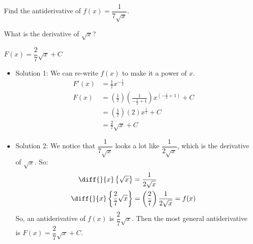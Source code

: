 \begin{question}
Find the  antiderivative of
$f(x)=\dfrac{1}{7\sqrt{x}}$.
\end{question}
\begin{hint}
What is the derivative of $\sqrt{x}$?
\end{hint}
\begin{answer}
$F(x)=\dfrac{2}{7}\sqrt{x}+C$
\end{answer}
\begin{solution}
\begin{itemize}
\item Solution 1:
We can re-write $f(x)$ to make it a power of $x$.
\begin{align*}
F'(x)&=\frac{1}{7}x^{-\tfrac{1}{2}}\\
F(x)&=\left(\frac{1}{7}\right)\left(\frac{1}{-\frac{1}{2}+1}\right)x^{\left(-\tfrac{1}{2}+1\right)}+C\\
&=\left(\frac{1}{7}\right)(2)x^{\tfrac{1}{2}}+C\\
&=\frac{2}{7}\sqrt{x}+C
\end{align*}
\item Solution 2:
We notice that $\dfrac{1}{7\sqrt{x}}$ looks a lot like $\dfrac{1}{2\sqrt{x}}$, which is the derivative of $\sqrt{x}$. So:
\begin{align*}
\diff{}{x}\left\{\sqrt{x}\right\}&=\frac{1}{2\sqrt{x}}\\
\diff{}{x}\left\{\frac{2}{7}\sqrt{x}\right\}&=\left(\frac{2}{7}\right)\frac{1}{2\sqrt{x}}=f(x)
\end{align*}
So, an antiderivative of $f(x)$ is $\dfrac{2}{7}\sqrt{x}$. Then the most general antiderivative is $F(x)=\dfrac{2}{7}\sqrt{x}+C$.
\end{itemize}
\end{solution}


